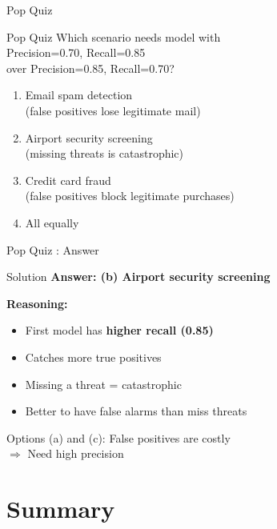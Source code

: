 \documentclass{beamer}
\newcounter{popquiz}
\begin{document}
\begin{frame}{Pop Quiz \thepopquiz}
\begin{popquizbox}{Pop Quiz \thepopquiz}
Which scenario needs model with \\
Precision=0.70, Recall=0.85 \\
over Precision=0.85, Recall=0.70?
\end{popquizbox}

\vspace{0.15cm}

\begin{enumerate}
    \item Email spam detection \\
          (false positives lose legitimate mail)
    \item Airport security screening \\
          (missing threats is catastrophic)
    \item Credit card fraud \\
          (false positives block legitimate purchases)
    \item All equally
\end{enumerate}
\end{frame}

\begin{frame}{Pop Quiz \thepopquiz: Answer}
\begin{examplebox}{Solution}
\small
\textbf{Answer: (b) Airport security screening}
\end{examplebox}

\vspace{0.15cm}

\textbf{Reasoning:}
\begin{itemize}
    \item First model has \textbf{higher recall (0.85)}
    \item Catches more true positives
    \item Missing a threat = catastrophic
    \item Better to have false alarms than miss threats
\end{itemize}

\vspace{0.15cm}

Options (a) and (c): False positives are costly \\
$\Rightarrow$ Need high precision
\end{frame}

\section{Summary}
\end{document}

